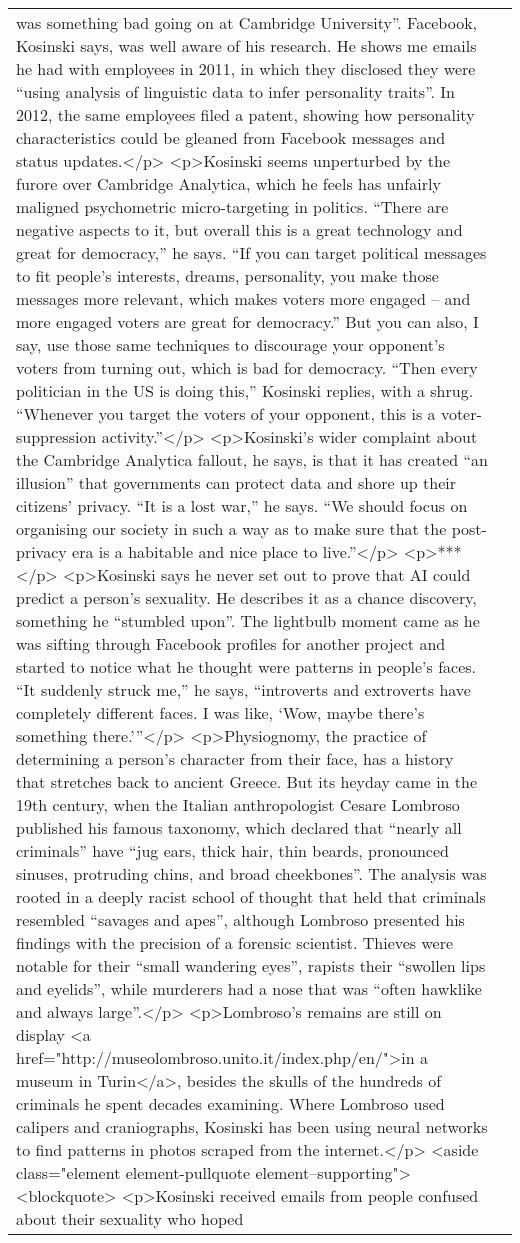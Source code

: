 \documentclass[]{article}
\begin{document}
\begin{table}[!h]
{\begin{tabular}[t]{ll}
was something bad going on at Cambridge University”. Facebook, Kosinski says, was well aware of his research. He shows me emails he had with employees in 2011, in which they disclosed they were “using analysis of linguistic data to infer personality traits”. In 2012, the same employees filed a patent, showing how personality characteristics could be gleaned from Facebook messages and status updates.</p> <p>Kosinski seems unperturbed by the furore over Cambridge Analytica, which he feels has unfairly maligned psychometric micro-targeting in politics. “There are negative aspects to it, but overall this is a great technology and great for democracy,” he says. “If you can target political messages to fit people’s interests, dreams, personality, you make those messages more relevant, which makes voters more engaged – and more engaged voters are great for democracy.” But you can also, I say, use those same techniques to discourage your opponent’s voters from turning out, which is bad for democracy. “Then every politician in the US is doing this,” Kosinski replies, with a shrug. “Whenever you target the voters of your opponent, this is a voter-suppression activity.”</p> <p>Kosinski’s wider complaint about the Cambridge Analytica fallout, he says, is that it has created “an illusion” that governments can protect data and shore up their citizens’ privacy. “It is a lost war,” he says. “We should focus on organising our society in such a way as to make sure that the post-privacy era is a habitable and nice place to live.”</p> <p>***</p> <p>Kosinski says he never set out to prove that AI could predict a person’s sexuality. He describes it as a chance discovery, something he “stumbled upon”. The lightbulb moment came as he was sifting through Facebook profiles for another project and started to notice what he thought were patterns in people’s faces. “It suddenly struck me,” he says, “introverts and extroverts have completely different faces. I was like, ‘Wow, maybe there’s something there.’”</p> <p>Physiognomy, the practice of determining a person’s character from their face, has a history that stretches back to ancient Greece. But its heyday came in the 19th century, when the Italian anthropologist Cesare Lombroso published his famous taxonomy, which declared that “nearly all criminals” have “jug ears, thick hair, thin beards, pronounced sinuses, protruding chins, and broad cheekbones”. The analysis was rooted in a deeply racist school of thought that held that criminals resembled “savages and apes”, although Lombroso presented his findings with the precision of a forensic scientist. Thieves were notable for their “small wandering eyes”, rapists their “swollen lips and eyelids”, while murderers had a nose that was “often hawklike and always large”.</p> <p>Lombroso’s remains are still on display <a href="http://museolombroso.unito.it/index.php/en/">in a museum in Turin</a>, besides the skulls of the hundreds of criminals he spent decades examining. Where Lombroso used calipers and craniographs, Kosinski has been using neural networks to find patterns in photos scraped from the internet.</p>  <aside class="element element-pullquote element--supporting"> <blockquote> <p>Kosinski received emails from people confused about their sexuality who hoped 
\end{tabular}}
\end{table}
\end{document}
